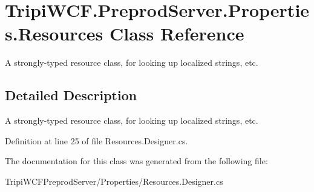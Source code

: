\hypertarget{class_tripi_w_c_f_1_1_preprod_server_1_1_properties_1_1_resources}{
\section{TripiWCF.PreprodServer.Properties.Resources Class Reference}
\label{class_tripi_w_c_f_1_1_preprod_server_1_1_properties_1_1_resources}
}


A strongly-\/typed resource class, for looking up localized strings, etc.  


\subsection{Detailed Description}
A strongly-\/typed resource class, for looking up localized strings, etc. 

Definition at line 25 of file Resources.Designer.cs.

The documentation for this class was generated from the following file:\begin{DoxyCompactItemize}
\item 
TripiWCFPreprodServer/Properties/Resources.Designer.cs\end{DoxyCompactItemize}
